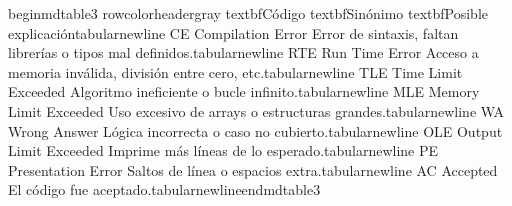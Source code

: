 \markdownRendererDocumentBegin
\markdownRendererSectionBegin
{}\markdownRendererInterblockSeparator
{}\markdownRendererSectionBegin
{}\markdownRendererInterblockSeparator
{}\markdownRendererBackslash{}begin\markdownRendererLeftBrace{}mdtable3\markdownRendererRightBrace{}\markdownRendererSoftLineBreak
{}\markdownRendererBackslash{}rowcolor\markdownRendererLeftBrace{}headergray\markdownRendererRightBrace{}\markdownRendererSoftLineBreak
{}\markdownRendererBackslash{}textbf\markdownRendererLeftBrace{}Código\markdownRendererRightBrace{} \markdownRendererAmpersand{} \markdownRendererBackslash{}textbf\markdownRendererLeftBrace{}Sinónimo\markdownRendererRightBrace{} \markdownRendererAmpersand{} \markdownRendererBackslash{}textbf\markdownRendererLeftBrace{}Posible explicación\markdownRendererRightBrace{}\markdownRendererBackslash{}tabularnewline\markdownRendererSoftLineBreak
{}CE \markdownRendererAmpersand{} Compilation Error \markdownRendererAmpersand{} Error de sintaxis, faltan librerías o tipos mal definidos.\markdownRendererBackslash{}tabularnewline\markdownRendererSoftLineBreak
{}RTE \markdownRendererAmpersand{} Run Time Error \markdownRendererAmpersand{} Acceso a memoria inválida, división entre cero, etc.\markdownRendererBackslash{}tabularnewline\markdownRendererSoftLineBreak
{}TLE \markdownRendererAmpersand{} Time Limit Exceeded \markdownRendererAmpersand{} Algoritmo ineficiente o bucle infinito.\markdownRendererBackslash{}tabularnewline\markdownRendererSoftLineBreak
{}MLE \markdownRendererAmpersand{} Memory Limit Exceeded \markdownRendererAmpersand{} Uso excesivo de arrays o estructuras grandes.\markdownRendererBackslash{}tabularnewline\markdownRendererSoftLineBreak
{}WA \markdownRendererAmpersand{} Wrong Answer \markdownRendererAmpersand{} Lógica incorrecta o caso no cubierto.\markdownRendererBackslash{}tabularnewline\markdownRendererSoftLineBreak
{}OLE \markdownRendererAmpersand{} Output Limit Exceeded \markdownRendererAmpersand{} Imprime más líneas de lo esperado.\markdownRendererBackslash{}tabularnewline\markdownRendererSoftLineBreak
{}PE \markdownRendererAmpersand{} Presentation Error \markdownRendererAmpersand{} Saltos de línea o espacios extra.\markdownRendererBackslash{}tabularnewline\markdownRendererSoftLineBreak
{}AC \markdownRendererAmpersand{} Accepted \markdownRendererAmpersand{} El código fue aceptado.\markdownRendererBackslash{}tabularnewline\markdownRendererBackslash{}end\markdownRendererLeftBrace{}mdtable3\markdownRendererRightBrace{}\markdownRendererInterblockSeparator
